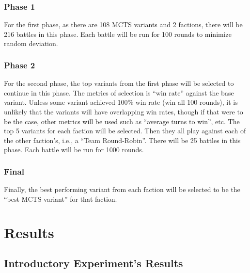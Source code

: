\subsubsection{Phase 1}
For the first phase, as there are 108 MCTS variants and 2 factions, there will be 216 battles in this phase. Each battle will be run for 100 rounds to minimize random deviation.

\subsubsection{Phase 2}
For the second phase, the top variants from the first phase will be selected to continue in this phase. The metrics of selection is ``win rate'' against the base variant. Unless some variant achieved 100\% win rate (win all 100 rounds), it is unlikely that the variants will have overlapping win rates, though if that were to be the case, other metrics will be used such as ``average turns to win'', etc. The top 5 variants for each faction will be selected. Then they all play against each of the other faction's, i.e., a ``Team Round-Robin''. There will be 25 battles in this phase. Each battle will be run for 1000 rounds.

\subsubsection{Final}
Finally, the best performing variant from each faction will be selected to be the ``best MCTS variant'' for that faction.



\section{Results}

\subsection{Introductory Experiment's Results}

    
